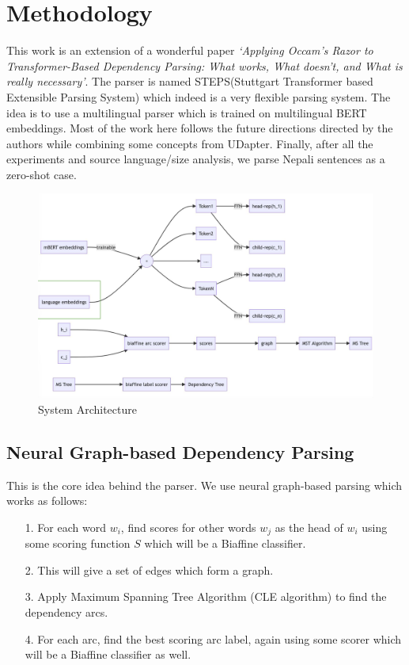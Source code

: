 \chapter{Methodology}
This work is an extension of a wonderful paper \textit{`Applying Occam's Razor
to Transformer-Based Dependency Parsing: What works, What doesn't, and What is
really necessary'}\cite{steps-parser}. The parser is named STEPS(Stuttgart
Transformer based Extensible Parsing System) which indeed is a very flexible
parsing system. The idea is to use a multilingual parser which is trained on
multilingual BERT embeddings. Most of the work here follows the future
directions directed by the authors\cite{steps-parser} while combining some
concepts from UDapter\cite{udapter}. Finally, after all the experiments and
source language/size analysis, we parse Nepali sentences as a zero-shot case.

\begin{figure}[!h]
    \center
    \includegraphics[scale=0.3]{images/Thesis_Architecture}
    \caption{System Architecture}
    \label{system_architecture}
\end{figure}

\section{Neural Graph-based Dependency Parsing}
This is the core idea behind the parser. We use neural graph-based parsing which works as follows:
\begin{itemize}
    \item[1.] For each word $w_i$, find scores for other words $w_j$ as the head of $w_i$ using some scoring function $S$ which will be a Biaffine classifier.
    \item[2.] This will give a set of edges which form a graph.
    \item[3.] Apply Maximum Spanning Tree Algorithm (CLE algorithm) to find the dependency arcs.
    \item[4.] For each arc, find the best scoring arc label, again using some scorer which will be a Biaffine classifier as well.
\end{itemize}

